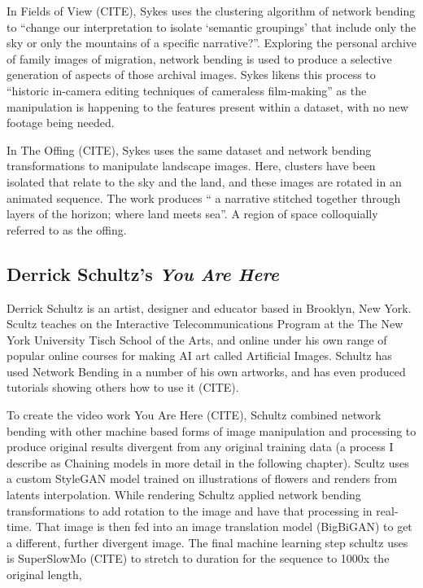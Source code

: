 In Fields of View (CITE), Sykes uses the clustering algorithm of network bending to “change our interpretation to isolate ‘semantic groupings’ that include only the sky or only the mountains of a specific narrative?”. 
Exploring the personal archive of family images of migration, network bending is used to produce a selective generation of aspects of those archival images. 
Sykes likens this process to “historic in-camera editing techniques of cameraless film-making” as the manipulation is happening to the features present within a dataset, with no new footage being needed.

In The Offing (CITE), Sykes uses the same dataset and network bending transformations to manipulate landscape images. 
Here, clusters have been isolated that relate to the sky and the land, and these images are rotated in an animated sequence. 
The work produces “ a narrative stitched together through layers of the horizon; where land meets sea”. 
A region of space colloquially referred to as the offing. 

\subsection{Derrick Schultz's \textit{You Are Here}}

Derrick Schultz is an artist, designer and educator based in Brooklyn, New York. Scultz teaches on the Interactive Telecommunications Program at the The New York University Tisch School of the Arts, and online under his own range of popular online courses for making AI art called Artificial Images. 
Schultz has used Network Bending in a number of his own artworks, and has even produced tutorials showing others how to use it (CITE). 

To create the video work You Are Here (CITE), Schultz combined network bending with other machine based forms of image manipulation and processing to produce original results divergent from any original training data (a process I describe as Chaining models in more detail in the following chapter). 
Scultz uses a custom StyleGAN model trained on illustrations of flowers and renders from latents interpolation. 
While rendering Schultz applied network bending transformations to add rotation to the image and have that processing in real-time. 
That image is then fed into an image translation model (BigBiGAN) to get a different, further divergent image. 
The final machine learning step schultz uses is SuperSlowMo (CITE) to stretch to duration for the sequence to 1000x the original length,

